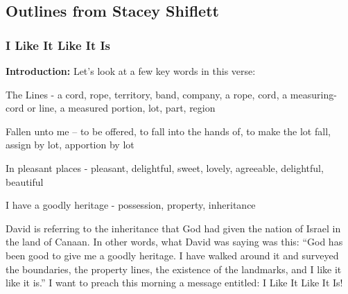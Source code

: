 \subsection{Outlines from Stacey Shiflett}


\subsubsection{I Like It Like It Is}



\noindent \textbf{Introduction: } Let’s look at a few key words in this verse:
\begin{compactenum}[1.][8]
    \item The Lines - a cord, rope, territory, band, company, a rope, cord, a measuring-cord or line, a measured portion, lot, part, region
    \item Fallen unto me – to be offered, to fall into the hands of, to make the lot fall, assign by lot, apportion by lot
    \item In pleasant places - pleasant, delightful, sweet, lovely, agreeable, delightful, beautiful
    \item I have a goodly heritage - possession, property, inheritance\\
\end{compactenum}
David is referring to the inheritance that God had given the nation of Israel in the land of Canaan.
In other words, what David was saying was this: “God has been good to give me a goodly heritage. I have walked around it and surveyed the boundaries, the property lines, the existence of the landmarks, and I like it like it is.”
I want to preach this morning a message entitled: I Like It Like It Is!\\

